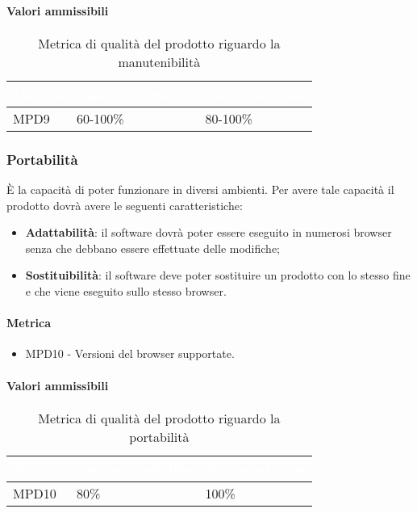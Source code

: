 \paragraph{Valori ammissibili}
\renewcommand{\arraystretch}{1.5}
\begin{longtable}{C{2.5cm} C{4cm} C{4cm}}
\textcolor{white}{\textbf{Metrica}}&
\textcolor{white}{\textbf{Valore accettabile}}&
\textcolor{white}{\textbf{Valore ottimale}}\\	
\endhead
\endfoot
{}\caption{Metrica di qualità del prodotto riguardo la manutenibilità}
\endlastfoot
		MPD9 &  
		60-100\% &
		80-100\% \\
\end{longtable}
\subsubsection{Portabilità}
È la capacità di poter funzionare in diversi ambienti. Per avere tale capacità il prodotto dovrà avere le seguenti caratteristiche:
\begin{itemize}
\item \textbf{Adattabilità}: il software dovrà poter essere eseguito in numerosi browser senza che debbano essere effettuate delle modifiche;
\item \textbf{Sostituibilità}: il software deve poter sostituire un prodotto con lo stesso fine e che viene eseguito sullo stesso browser. 
\end{itemize}
\paragraph{Metrica}
\begin{itemize}
\item MPD10 - Versioni del browser supportate.
\end{itemize}
\paragraph{Valori ammissibili}
\renewcommand{\arraystretch}{1.5}
\begin{longtable}{C{2.5cm} C{4cm} C{4cm}}
\textcolor{white}{\textbf{Metrica}}&
\textcolor{white}{\textbf{Valore accettabile}}&
\textcolor{white}{\textbf{Valore ottimale}}\\	
\endhead
\endfoot
{}\caption{Metrica di qualità del prodotto riguardo la portabilità}
\endlastfoot
		MPD10 &  
		80\% &
		100\% \\
\end{longtable}